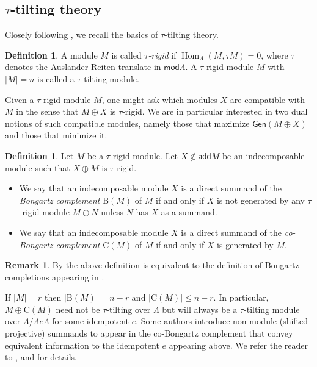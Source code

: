 \documentclass[11pt]{amsart}
\newcommand{\add}{\mathsf{add}}
\newcommand{\Gen}{\mathsf{Gen}}
\newcommand{\mods}{\mathsf{mod}}
\newcommand{\bcomp}{\mathrm{B}}
\newcommand{\ccomp}{\mathrm{C}}
\DeclareMathOperator{\Hom}{\mathrm{Hom}}
\theoremstyle{definition}
\newtheorem{definition}[theorem]{Definition}
\newtheorem{remark}[theorem]{Remark}
\begin{document}
\subsection{$\tau$-tilting theory}
Closely following \cite{tau}, we recall the basics of $\tau$-tilting theory. 

\begin{definition}\cite[Def. 0.1]{tau}
    A module $M$ is called \textit{$\tau$-rigid} if $\Hom_\Lambda(M,\tau M) = 0$, where $\tau$ denotes the Auslander-Reiten translate in $\mods \Lambda$. A $\tau$-rigid module $M$ with $|M| = n$ is called a $\tau$-tilting module.
\end{definition}

Given a $\tau$-rigid module $M$, one might ask which modules $X$ are compatible with $M$ in the sense that $M \oplus X$ is $\tau$-rigid. We are in particular interested in two dual notions of such compatible modules, namely those that maximize $\Gen (M\oplus X)$ and those that minimize it. 

\begin{definition}
    Let $M$ be a $\tau$-rigid module. Let $X \notin \add M$ be an indecomposable module such that $X\oplus M$ is $\tau$-rigid.

    \begin{itemize}
        \item We say that an indecomposable module $X$ is a direct summand of the \textit{Bongartz complement} $\bcomp(M)$ of $M$ if and only if $X$ is not generated by any $\tau$-rigid module $M\oplus N$ unless $N$ has $X$ as a summand.
        \item We say that an indecomposable module $X$ is a direct summand of the \textit{co-Bongartz complement} $\ccomp(M)$ of $M$ if and only if $X$ is generated by $M$.
    \end{itemize}
    
\end{definition}

\begin{remark}
    By \cite[Thm. 4.4]{dirrt} the above definition is equivalent to the definition of Bongartz completions appearing in \cite[Thm. 2]{tau}.
    
    If $|M| = r$ then $|\bcomp(M)| = n-r$ and $|\ccomp(M)| \leq n-r$. In particular, $M \oplus \ccomp(M)$ need not be $\tau$-tilting over $\Lambda$ but will always be a $\tau$-tilting module over $\Lambda/\Lambda e \Lambda$ for some idempotent $e$. Some authors introduce non-module (shifted projective) summands to appear in the co-Bongartz complement that convey equivalent information to the idempotent $e$ appearing above. We refer the reader to \cite[Thm. 2.10 and 2.18]{tau}, \cite[Sec. 4]{dirrt} and \cite[Sec. 2 and 4]{bkt} for details.
\end{remark}
\end{document}

